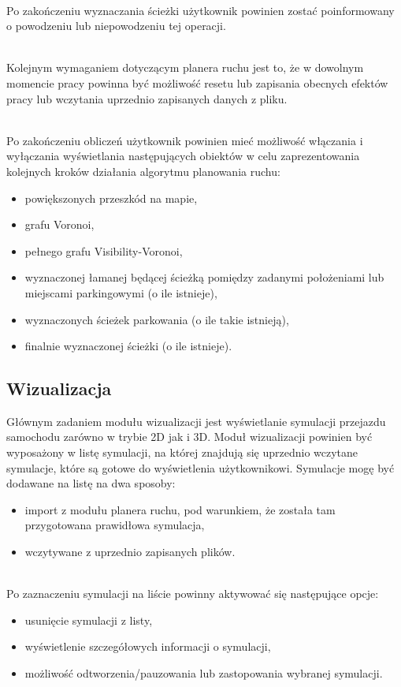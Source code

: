 \documentclass[a4paper,11pt,twoside]{report}
\theoremstyle{definition}
\begin{document}
~\\Po zakończeniu wyznaczania ścieżki użytkownik powinien zostać poinformowany o powodzeniu lub niepowodzeniu tej operacji.

~\\Kolejnym wymaganiem dotyczącym planera ruchu jest to, że w dowolnym momencie pracy powinna być możliwość resetu lub zapisania obecnych efektów pracy lub wczytania uprzednio zapisanych danych z pliku.

~\\Po zakończeniu obliczeń użytkownik powinien mieć możliwość włączania i wyłączania wyświetlania następujących obiektów w celu zaprezentowania kolejnych kroków działania algorytmu planowania ruchu:
\begin{itemize}
	\item powiększonych przeszkód na mapie,
	\item grafu Voronoi,
	\item pełnego grafu Visibility-Voronoi,
	\item wyznaczonej łamanej będącej ścieżką pomiędzy zadanymi położeniami lub miejscami parkingowymi (o ile istnieje),
	\item wyznaczonych ścieżek parkowania (o ile takie istnieją),
	\item finalnie wyznaczonej ścieżki (o ile istnieje).
\end{itemize}

\subsection{Wizualizacja}

Głównym zadaniem modułu wizualizacji jest wyświetlanie symulacji przejazdu samochodu zarówno w trybie 2D jak i 3D. Moduł wizualizacji powinien być wyposażony w listę symulacji, na której znajdują się uprzednio wczytane symulacje, które są gotowe do wyświetlenia użytkownikowi. Symulacje mogę być dodawane na listę na dwa sposoby:
\begin{itemize}
	\item import z modułu planera ruchu, pod warunkiem, że została tam przygotowana prawidłowa symulacja,
	\item wczytywane z uprzednio zapisanych plików. 
\end{itemize}

~\\Po zaznaczeniu symulacji na liście powinny aktywować się następujące opcje:
\begin{itemize}
	\item usunięcie symulacji z listy,
	\item wyświetlenie szczegółowych informacji o symulacji,
	\item możliwość odtworzenia/pauzowania lub zastopowania wybranej symulacji.
\end{itemize}
\end{document}

